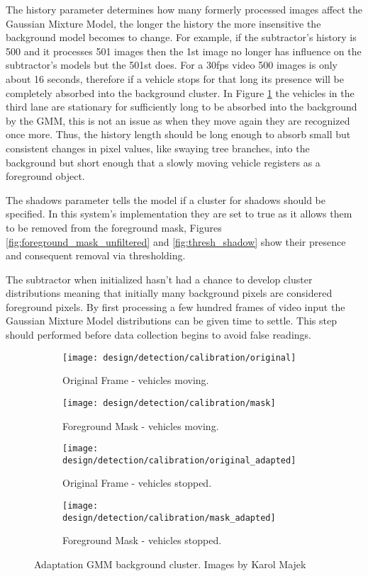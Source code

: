The history parameter determines how many formerly processed images affect the Gaussian Mixture Model, the longer the history the more insensitive the background model becomes to change. For example, if the subtractor's history is 500 and it processes 501 images then the 1st image no longer has influence on the subtractor's models but the 501st does. For a 30fps video 500 images is only about 16 seconds, therefore if a vehicle stops for that long its presence will be completely absorbed into the background cluster. In Figure \ref{fig:cluster_adaptation} the vehicles in the third lane are stationary for sufficiently long to be absorbed into the background by the GMM, this is not an issue as when they move again they are recognized once more. Thus, the history length should be long enough to absorb small but consistent changes in pixel values, like swaying tree branches, into the background but short enough that a slowly moving vehicle registers as a foreground object. 

The shadows parameter tells the model if a cluster for shadows should be specified. In this system's implementation they are set to true as it allows them to be removed from the foreground mask, Figures \ref{fig:foreground_mask_unfiltered} and \ref{fig:thresh_shadow} show their presence and consequent removal via thresholding. 

The subtractor when initialized hasn't had a chance to develop cluster distributions meaning that initially many background pixels are considered foreground pixels. By first processing a few hundred frames of video input the Gaussian Mixture Model distributions can be given time to settle. This  step should performed before data collection begins to avoid false readings.
 
\begin{figure}[H]
	\centering
	\begin{subfigure}[b]{0.4\linewidth}
        \centering\texttt{[image: design/detection/calibration/original]}
        \caption{Original Frame - vehicles moving.}
    \end{subfigure}%
    \begin{subfigure}[b]{0.4\linewidth}
        \centering\texttt{[image: design/detection/calibration/mask]}
        \caption{Foreground Mask - vehicles moving.}
    \end{subfigure}
    \begin{subfigure}[b]{0.4\linewidth}
        \centering\texttt{[image: design/detection/calibration/original\_adapted]}
        \caption{Original Frame - vehicles stopped.}
    \end{subfigure}%
    	\begin{subfigure}[b]{0.4\linewidth}
        \centering\texttt{[image: design/detection/calibration/mask\_adapted]}
        \caption{Foreground Mask - vehicles stopped.}
    \end{subfigure}
    \caption{Adaptation GMM background cluster. Images by Karol Majek}
    \label{fig:cluster_adaptation}
\end{figure}


